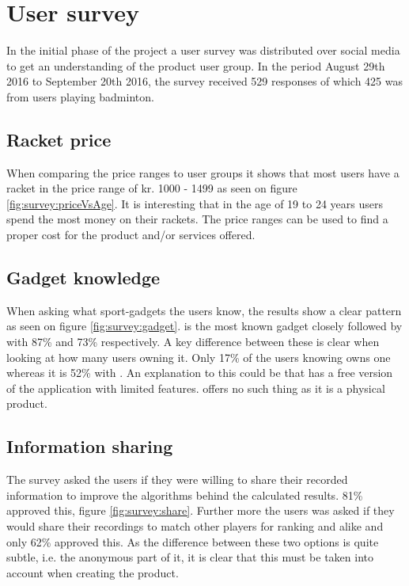 \section{User survey}
\label{sec:userSurvey}
In the initial phase of the project a user survey was distributed over social media to get an understanding of the product user group.
In the period August 29th 2016 to September 20th 2016, the survey received 529 responses of which 425 was from users playing badminton.

\subsection*{Racket price}
When comparing the price ranges to user groups it shows that most users have a racket in the price range of kr. 1000 - 1499 as seen on figure \ref{fig:survey:priceVsAge}.
It is interesting that in the age of 19 to 24 years users spend the most money on their rackets.
The price ranges can be used to find a proper cost for the product and/or services offered.


\subsection*{Gadget knowledge}
When asking what sport-gadgets the users know, the results show a clear pattern as seen on figure \ref{fig:survey:gadget}.
 is the most known gadget closely followed by  with 87\% and 73\% respectively.
A key difference between these is clear when looking at how many users owning it.
Only 17\% of the users knowing  owns one whereas it is 52\% with .
An explanation to this could be that  has a free version of the application with limited features.
 offers no such thing as it is a physical product.


\subsection*{Information sharing}
The survey asked the users if they were willing to share their recorded information to improve the algorithms behind the calculated results. 
81\% approved this, figure \ref{fig:survey:share}.
Further more the users was asked if they would share their recordings to match other players for ranking and alike and only 62\% approved this.
As the difference between these two options is quite subtle, i.e. the anonymous part of it, it is clear that this must be taken into account when creating the product.
 
